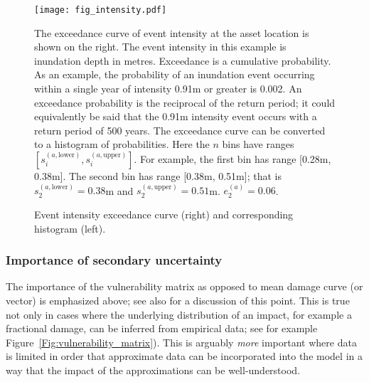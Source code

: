 \documentclass{article}
\begin{document}
\begin{figure}[ht]

    \begin{framed}

        \texttt{[image: fig\_intensity.pdf]}

    \end{framed}

    \footnotesize

    \renewcommand{\arraystretch}{1.01}

    \vspace{-3ex}

    {\justify
        The exceedance curve of event intensity at the asset location is shown on the right. The event intensity in this example is inundation depth in metres. Exceedance is a cumulative probability. As an example, the probability of an inundation event occurring within a single year of intensity 0.91m or greater is 0.002. An exceedance probability is the reciprocal of the return period; it could equivalently be said that the 0.91m intensity event occurs with a return period of 500 years.
        The exceedance curve can be converted to a histogram of probabilities. Here the $n$ bins have ranges $[s^{(a, \text{lower})}_i, s^{(a, \text{upper})}_i]$. For example, the first bin has range [0.28m, 0.38m]. The second bin has range [0.38m,    0.51m]; that is $s^{(a, \text{lower})}_2 = 0.38$m and $s^{(a, \text{upper})}_2 = 0.51$m. $e^{(a)}_2 = 0.06$.
        \par}

    \vspace{-0.5ex}

    \caption{\small Event intensity exceedance curve (right) and corresponding histogram (left).}
    \label{Fig:intensity}

\end{figure}

\subsubsection{Importance of secondary uncertainty}
The importance of the vulnerability matrix as opposed to mean damage curve (or vector) is emphasized above; see also \cite{Taylor:2015} for a discussion of this point. This is true not only in cases where the underlying distribution of an impact, for example a fractional damage, can be inferred from empirical data; see for example Figure~\ref{Fig:vulnerability_matrix}). This is arguably \emph{more} important where data is limited in order that approximate data can be incorporated into the model in a way that the impact of the approximations can be well-understood.
\end{document}
